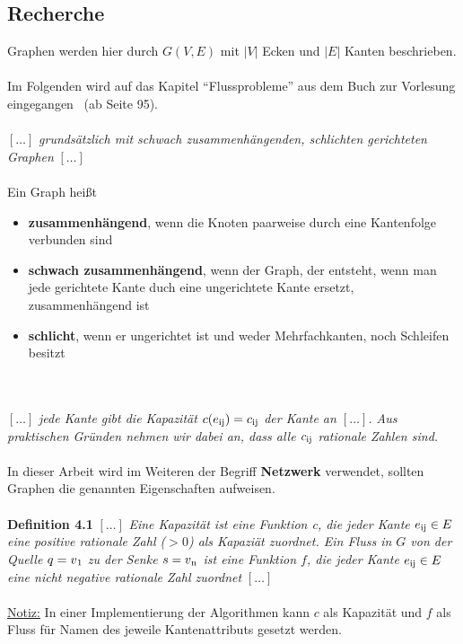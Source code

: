 \documentclass[11pt]{article}
\begin{document}
\subsection{Recherche}
Graphen werden hier durch $G(V,E)$ mit $|V|$ Ecken und $|E|$ Kanten beschrieben.\\~\\
Im Folgenden wird auf das Kapitel "`Flussprobleme"' aus dem Buch zur Vorlesung eingegangen~\cite{grbuch} (ab Seite 95).\\~\\
$[\ldots]$ \textit{grunds\"atzlich mit schwach zusammenh\"angenden, schlichten gerichteten Graphen} $[\ldots]$\\~\\
Ein Graph hei\ss{}t
\begin{itemize}
\item \textbf{zusammenh\"angend}, wenn die Knoten paarweise durch eine Kantenfolge verbunden sind
\item \textbf{schwach zusammenh\"angend}, wenn der Graph, der entsteht, wenn man jede gerichtete Kante duch eine ungerichtete Kante ersetzt, zusammenh\"angend ist
\item \textbf{schlicht}, wenn er ungerichtet ist und weder Mehrfachkanten, noch Schleifen besitzt
\end{itemize}\\~\\
$[\ldots]$ \textit{jede Kante gibt die Kapazit\"at $c(e\textsubscript{ij})=c\textsubscript{ij}$ der Kante an $[\ldots]$. Aus praktischen Gr\"unden nehmen wir dabei an, dass alle $c\textsubscript{ij}$ rationale Zahlen sind.}\\~\\
In dieser Arbeit wird im Weiteren der Begriff \textbf{Netzwerk} verwendet, sollten Graphen die genannten Eigenschaften aufweisen.\\~\\
\textbf{Definition 4.1} $[\ldots]$ \textit{Eine Kapazit\"at ist eine Funktion c, die jeder Kante $e\textsubscript{ij} \in E$  eine positive rationale Zahl ($> 0$) als Kapazi\"at zuordnet. Ein Fluss in $G$ von der Quelle $q = v\textsubscript{1}$ zu der Senke $s = v\textsubscript{n}$ ist eine Funktion $f$, die jeder Kante $e\textsubscript{ij} \in E$ eine nicht negative rationale Zahl zuordnet} $[\ldots]$\\~\\
\underline{Notiz:} In einer Implementierung der Algorithmen kann $c$ als Kapazit\"at und $f$ als Fluss f\"ur Namen des jeweile Kantenattributs gesetzt werden.\\~\\
\end{document}
